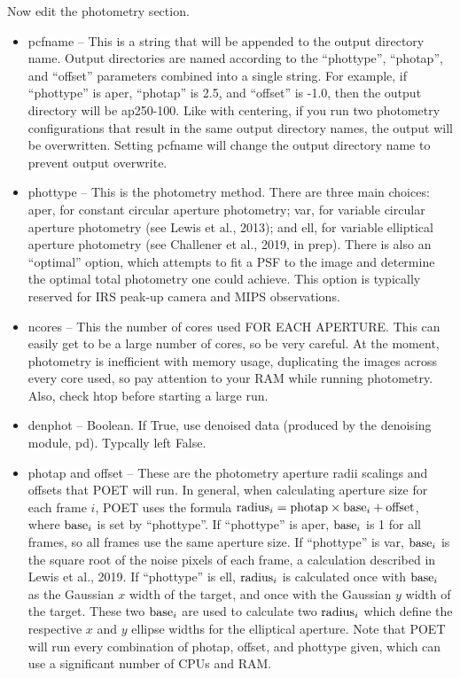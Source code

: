 \documentclass[letterpaper,12pt]{article}
\begin{document}
Now edit the photometry section.

\begin{itemize}
\item pcfname -- This is a string that will be appended to the output
  directory name. Output directories are named according to the
  ``phottype'', ``photap'', and ``offset'' parameters combined into a
  single string. For example, if ``phottype'' is aper, ``photap'' is
  2.5, and ``offset'' is -1.0, then the output directory will be
  ap250-100. Like with centering, if you run two photometry configurations
  that result in the same output directory names, the output will be
  overwritten. Setting pcfname will change the output directory name to
  prevent output overwrite.
  
\item phottype -- This is the photometry method. There are three main
  choices: aper, for constant circular aperture photometry; var, for
  variable circular aperture photometry (see Lewis et al., 2013); and
  ell, for variable elliptical aperture photometry (see Challener et
  al., 2019, in prep). There is also an ``optimal'' option, which
  attempts to fit a PSF to the image and determine the optimal
  total photometry one could achieve. This option is typically
  reserved for IRS peak-up camera and MIPS observations.

\item ncores -- This the number of cores used FOR EACH APERTURE. This
  can easily get to be a large number of cores, so be very careful. At
  the moment, photometry is inefficient with memory usage, duplicating
  the images across every core used, so pay attention to your RAM
  while running photometry. Also, check htop before starting a large
  run.

\item denphot -- Boolean. If True, use denoised data (produced by the
  denoising module, pd). Typcally left False.

\item photap and offset -- These are the photometry aperture radii
  scalings and offsets that POET will run. In general, when
  calculating aperture size for each frame $i$, POET uses the formula
  ${\rm radius}_i = {\rm photap} \times {\rm base}_i + {\rm offset}$,
  where ${\rm base}_i$ is set by ``phottype''. If ``phottype'' is
  aper, ${\rm base}_i$ is 1 for all frames, so all frames use the same
  aperture size. If ``phottype'' is var, ${\rm base}_i$ is the square
  root of the noise pixels of each frame, a calculation described in
  Lewis et al., 2019. If ``phottype'' is ell, ${\rm radius}_i$ is
  calculated once with ${\rm base}_i$ as the Gaussian $x$ width of the
  target, and once with the Gaussian $y$ width of the target. These
  two ${\rm base}_i$ are used to calculate two ${\rm radius}_i$ which
  define the respective $x$ and $y$ ellipse widths for the elliptical
  aperture. Note that POET will run every combination of photap,
  offset, and phottype given, which can use a significant number of
  CPUs and RAM.


\end{itemize}
\end{document}
